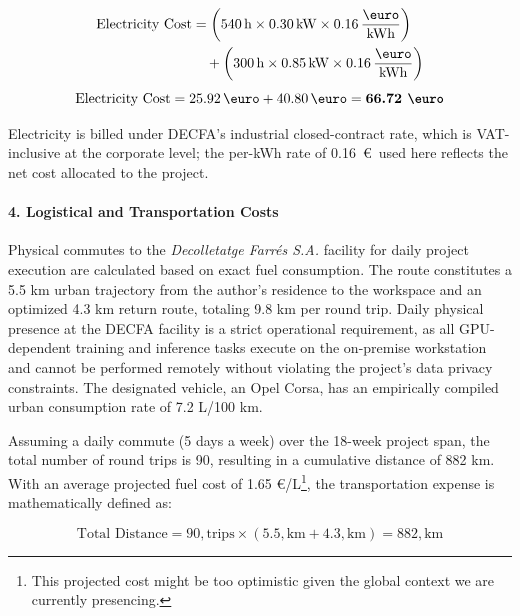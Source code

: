 \begin{itemize}
    \begin{equation}
        \begin{split}
            \text{Electricity Cost} &= \left( 540 \, \text{h} \times 0.30 \, \text{kW} \times 0.16 \, \frac{\text{\euro}}{\text{kWh}} \right) \\
            &\quad + \left( 300 \, \text{h} \times 0.85 \, \text{kW} \times 0.16 \, \frac{\text{\euro}}{\text{kWh}} \right)
        \end{split}
    \end{equation}
    \begin{equation*}
        \text{Electricity Cost} = 25.92 \, \text{\euro} + 40.80 \, \text{\euro} = \textbf{66.72 \euro}
    \end{equation*}

    Electricity is billed under DECFA's industrial closed-contract 
rate, which is VAT-inclusive at the corporate level; the per-kWh 
rate of 0.16~\euro\ used here reflects the net cost allocated to 
the project.
\end{itemize}

\paragraph{4. Logistical and Transportation Costs}
Physical commutes to the \textit{Decolletatge Farrés S.A.} facility for daily project execution are calculated based on exact fuel consumption. The route constitutes a 5.5 km urban trajectory from the author's residence to the workspace and an optimized 4.3 km return route, totaling 9.8 km per round trip.
Daily physical presence at the DECFA facility is a strict operational
requirement, as all GPU-dependent training and inference tasks execute
on the on-premise workstation and cannot be performed remotely without
violating the project's data privacy constraints.
The designated vehicle, an Opel Corsa, has an empirically compiled urban consumption rate of 7.2 L/100 km.

Assuming a daily commute (5 days a week) over the 18-week project span, the total number of round trips is 90, resulting in a cumulative distance of 882 km. With an average projected  fuel cost of 1.65 \euro/L\footnote{This projected cost might be too optimistic given the global context we are currently presencing.}, the transportation expense is mathematically defined as:

\begin{equation}
\text{Total Distance} = 90 , \text{trips} \times (5.5 , \text{km} + 4.3 , \text{km}) = 882 , \text{km}
\end{equation}

